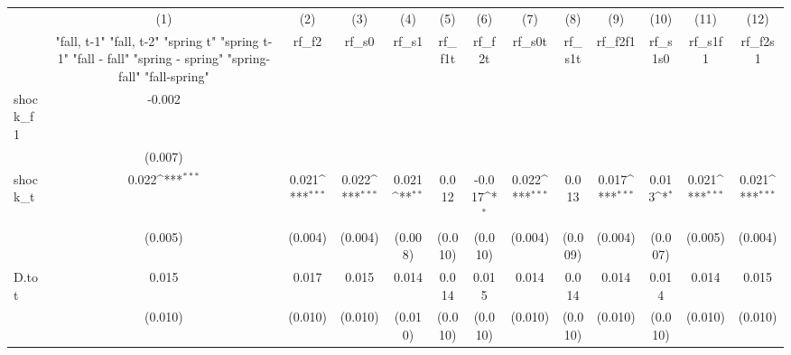 {
\def\sym#1{\ifmmode^{#1}\else\(^{#1}\)\fi}
\begin{tabular}{l*{12}{c}}
\toprule
            &\multicolumn{1}{c}{(1)}&\multicolumn{1}{c}{(2)}&\multicolumn{1}{c}{(3)}&\multicolumn{1}{c}{(4)}&\multicolumn{1}{c}{(5)}&\multicolumn{1}{c}{(6)}&\multicolumn{1}{c}{(7)}&\multicolumn{1}{c}{(8)}&\multicolumn{1}{c}{(9)}&\multicolumn{1}{c}{(10)}&\multicolumn{1}{c}{(11)}&\multicolumn{1}{c}{(12)}\\
            &\multicolumn{1}{c}{  "fall, t-1" "fall, t-2" "spring t" "spring t-1"  "fall - fall" "spring - spring" "spring-fall" "fall-spring" }&\multicolumn{1}{c}{rf\_f2}&\multicolumn{1}{c}{rf\_s0}&\multicolumn{1}{c}{rf\_s1}&\multicolumn{1}{c}{rf\_f1t}&\multicolumn{1}{c}{rf\_f2t}&\multicolumn{1}{c}{rf\_s0t}&\multicolumn{1}{c}{rf\_s1t}&\multicolumn{1}{c}{rf\_f2f1}&\multicolumn{1}{c}{rf\_s1s0}&\multicolumn{1}{c}{rf\_s1f1}&\multicolumn{1}{c}{rf\_f2s1}\\
\midrule
shock\_f1    &      -0.002         &                     &                     &                     &                     &                     &                     &                     &                     &                     &                     &                     \\
            &     (0.007)         &                     &                     &                     &                     &                     &                     &                     &                     &                     &                     &                     \\
\addlinespace
shock\_t     &       0.022\sym{***}&       0.021\sym{***}&       0.022\sym{***}&       0.021\sym{**} &       0.012         &      -0.017\sym{*}  &       0.022\sym{***}&       0.013         &       0.017\sym{***}&       0.013\sym{*}  &       0.021\sym{***}&       0.021\sym{***}\\
            &     (0.005)         &     (0.004)         &     (0.004)         &     (0.008)         &     (0.010)         &     (0.010)         &     (0.004)         &     (0.009)         &     (0.004)         &     (0.007)         &     (0.005)         &     (0.004)         \\
\addlinespace
D.tot       &       0.015         &       0.017         &       0.015         &       0.014         &       0.014         &       0.015         &       0.014         &       0.014         &       0.014         &       0.014         &       0.014         &       0.015         \\
            &     (0.010)         &     (0.010)         &     (0.010)         &     (0.010)         &     (0.010)         &     (0.010)         &     (0.010)         &     (0.010)         &     (0.010)         &     (0.010)         &     (0.010)         &     (0.010)         \\

\end{tabular}}
